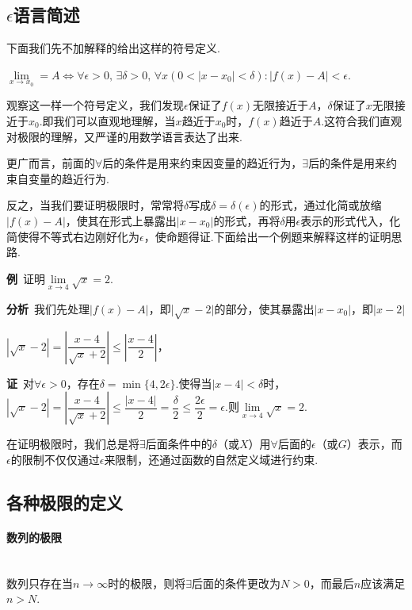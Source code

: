 \documentclass{ctexbook}
\begin{document}
	\subsection{$\epsilon$语言简述}
	
	下面我们先不加解释的给出这样的符号定义.
	
	$\lim\limits_{x \to x_0}=A \Leftrightarrow \forall \epsilon>0,\,\exists\delta>0,\,\forall x(0<|x-x_0|<\delta):|f(x)-A|<\epsilon$.
	
	观察这一样一个符号定义，我们发现$\epsilon$保证了$f(x)$无限接近于$A$，$\delta$保证了$x$无限接近于$x_0$.即我们可以直观地理解，当$x$趋近于$x_0$时，$f(x)$趋近于$A$.这符合我们直观对极限的理解，又严谨的用数学语言表达了出来.
	
	更广而言，前面的$\forall$后的条件是用来约束因变量的趋近行为，$\exists$后的条件是用来约束自变量的趋近行为.
	
	反之，当我们要证明极限时，常常将$\delta$写成$\delta=\delta(\epsilon)$的形式，通过化简或放缩$|f(x)-A|$，使其在形式上暴露出$|x-x_0|$的形式，再将$\delta$用$\epsilon$表示的形式代入，化简使得不等式右边刚好化为$\epsilon$，使命题得证.下面给出一个例题来解释这样的证明思路.
	
	\textbf{例}$\,\,\,$证明$\lim\limits_{x \to4}\sqrt{x}=2$.
	
	\textbf{分析}$\,\,\,$我们先处理$|f(x)-A|$，即|$\sqrt{x}-2|$的部分，使其暴露出$|x-x_0|$，即$|x-2|$
	
	\centerline{$|\sqrt{x}-2|=\left|\dfrac{x-4}{\sqrt{x}+2}\right|\le \left|\dfrac{x-4}{2}\right|$，}
	
	
	\textbf{证}$\,\,\,$对$\forall \epsilon>0$，存在$\delta=\min\{4,2\epsilon\}$.使得当$|x-4|<\delta$时，$|\sqrt{x}-2|=\left|\dfrac{x-4}{\sqrt{x}+2}\right|\le \dfrac{|x-4|}{2}= \dfrac{\delta}{2}\le \dfrac{2\epsilon}{2}=\epsilon$.则$\lim\limits_{x \to4}\sqrt{x}=2$.
	
	在证明极限时，我们总是将$\exists$后面条件中的$\delta$（或$X$）用$\forall$后面的$\epsilon$（或$G$）表示，而$\epsilon$的限制不仅仅通过$\epsilon$来限制，还通过函数的自然定义域进行约束.
	\subsection{各种极限的定义}
	\paragraph{数列的极限}~{}
	\\
	\indent
	数列只存在当$n \to \infty$时的极限，则将$\exists$后面的条件更改为$N>0$，而最后$n$应该满足$n>N$.
	
\end{document}
